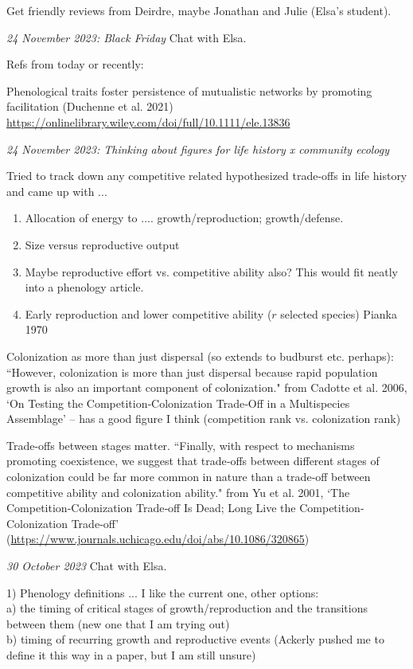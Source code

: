 \documentclass[11pt]{article}
\begin{document}
Get friendly reviews from Deirdre, maybe Jonathan and Julie (Elsa's student).

\emph{24 November 2023: Black Friday} Chat with Elsa.

Refs from today or recently:

Phenological traits foster persistence of mutualistic networks by promoting facilitation (Duchenne et al. 2021) \url{https://onlinelibrary.wiley.com/doi/full/10.1111/ele.13836}

\emph{24 November 2023: Thinking about figures for life history x community ecology} 

Tried to track down any competitive related hypothesized trade-offs in life history and came up with ... 
\begin{enumerate}
\item Allocation of energy to .... growth/reproduction; growth/defense.
\item Size versus reproductive output
\item Maybe reproductive effort vs. competitive ability also? This would fit neatly into a phenology article. 
\item Early reproduction and lower competitive ability ($r$ selected species) Pianka 1970
\end{enumerate}

Colonization as more than just dispersal (so extends to budburst etc. perhaps): ``However, colonization is more than just dispersal because rapid population growth is also an important component of colonization." from Cadotte et al. 2006, `On Testing the Competition‐Colonization Trade‐Off in a Multispecies Assemblage' -- has a good figure I think (competition rank vs. colonization rank)

Trade-offs between stages matter. ``Finally, with respect to mechanisms promoting coexistence, we suggest that trade‐offs between different stages of colonization could be far more common in nature than a trade‐off between competitive ability and colonization ability." from Yu et al. 2001, `The Competition‐Colonization Trade‐off Is Dead; Long Live the Competition‐Colonization Trade‐off' (\url{https://www.journals.uchicago.edu/doi/abs/10.1086/320865})

\emph{30 October 2023} Chat with Elsa.

1) Phenology definitions ... I like the current one, other options:\\
a) the timing of critical stages of growth/reproduction and the transitions between them (new one that I am trying out)\\
b) timing of recurring growth and reproductive events (Ackerly pushed me to define it this way in a paper, but I am still unsure)\\
\end{document}
